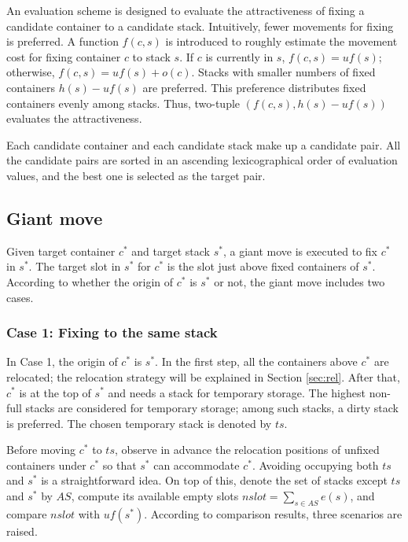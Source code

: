 \documentclass[review,3p,times,authoryear,12pt]{elsarticle}
\begin{document}
An evaluation scheme is designed to evaluate the attractiveness of fixing a candidate container to a candidate stack.
Intuitively, fewer movements for fixing is preferred. 
A function $f(c,s)$ is introduced to roughly estimate the movement cost for fixing container $c$ to stack $s$. 
If $c$ is currently in $s$, $f(c,s)=\mathit{uf}(s)$; otherwise, $f(c,s)=\mathit{uf}(s)+o(c)$. 
Stacks with smaller numbers of fixed containers $h(s)-\mathit{uf}(s)$ are preferred. 
This preference distributes fixed containers evenly among stacks. 
Thus, two-tuple $(f(c,s), h(s)-\mathit{uf}(s))$ evaluates the attractiveness.

Each candidate container and each candidate stack make up a candidate pair. 
All the candidate pairs are sorted in an ascending lexicographical order of evaluation values, and the best one is selected as the target pair.

\subsection{Giant move}

Given target container $c^*$ and target stack $s^*$, a giant move is executed to fix $c^*$ in $s^*$. 
The target slot in $s^*$ for $c^*$ is the slot just above fixed containers of $s^*$. 
According to whether the origin of $c^*$ is $s^*$ or not, the giant move includes two cases. 

\subsubsection{Case 1: Fixing to the same stack}

In Case 1, the origin of $c^*$ is $s^*$. 
In the first step, all the containers above $c^*$ are relocated; the relocation strategy will be explained in Section \ref{sec:rel}. 
After that, $c^*$ is at the top of $s^*$ and needs a stack for temporary storage. 
The highest non-full stacks are considered for temporary storage; among such stacks, a dirty stack is preferred. The chosen temporary stack is denoted by $\mathit{ts}$.

Before moving $c^*$ to $\mathit{ts}$, observe in advance the relocation positions of unfixed containers under $c^*$ so that $s^*$ can accommodate $c^*$. 
Avoiding occupying both $\mathit{ts}$ and $s^*$ is a straightforward idea. 
On top of this, denote the set of stacks except $\mathit{ts}$ and $s^*$ by $\mathit{AS}$, compute its available empty slots $\mathit{nslot} = \sum_{s\in \mathit{AS}}e(s)$, and compare $\mathit{nslot}$ with $\mathit{uf}(s^*)$. 
According to comparison results, three scenarios are raised.
\end{document}
